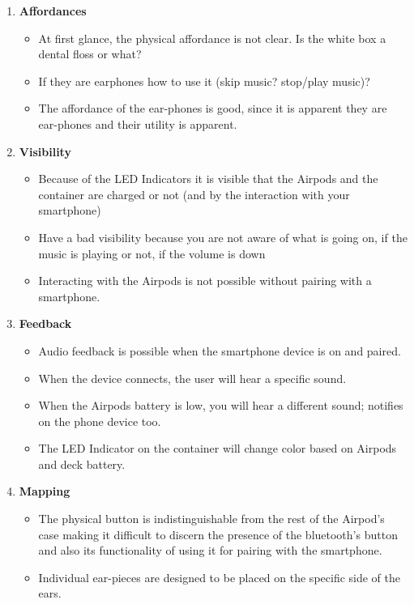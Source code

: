 \documentclass[10pt]{scrartcl}
\begin{document}
\begin{enumerate}
		\item \textbf{Affordances} 
		\begin{itemize}
			\item At first glance, the physical affordance is not clear. Is the white box a dental floss or what?
		    \item If they are earphones how to use it (skip music? stop/play music)?
		    \item The affordance of the ear-phones is good, since it is apparent they are ear-phones and their utility is apparent.
			\end{itemize}
		\item \textbf{Visibility} 
		\begin{itemize}
	\item Because of the LED Indicators it is visible that the Airpods and the container are charged or not (and by the interaction with your smartphone)
	\item Have a bad visibility because you are not aware of what is going on, if the music is playing or not, if the volume is down
	\item Interacting with the Airpods is not possible without pairing with a smartphone.
	
		\end{itemize}
		
		\item \textbf{Feedback} 
		\begin{itemize}
\item Audio feedback is possible when the smartphone device is on and paired. 
\item When the device connects, the user will hear a specific sound. 
\item When the Airpods battery is low, you will hear a different sound; notifies on the phone device too.
\item The LED Indicator on the container will change color based on Airpods and deck battery.

		\end{itemize}
		\item \textbf{Mapping} 
		\begin{itemize}
\item The physical button is indistinguishable from the rest of the Airpod’s case making it difficult to discern the presence of the bluetooth's button and also its functionality of using it for pairing with the smartphone.
\item Individual ear-pieces are designed to be placed on the specific side of the ears. 



\end{itemize}
\end{enumerate}
\end{document}

